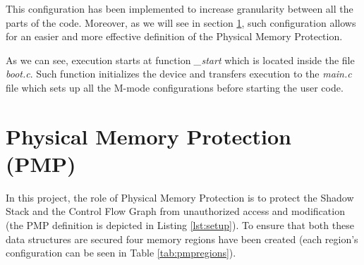 This configuration has been implemented to increase granularity between all the parts
of the code. Moreover, as we will see in section \ref{sec:project_pmp}, such
configuration allows for an easier and more effective definition of the Physical
Memory Protection.

As we can see, execution starts at function \textit{\_start} which is located
inside the file \textit{boot.c}. Such function initializes the device and
transfers execution to the \textit{main.c} file which sets up all the M-mode configurations
before starting the user code.

\section{Physical Memory Protection (PMP)}
\label{sec:project_pmp}

In this project, the role of Physical Memory Protection is to protect the Shadow
Stack and the Control Flow Graph from unauthorized access and modification (the
PMP definition is depicted in Listing \ref{lst:setup}). To ensure that both
these data structures are secured four memory regions have been created (each region's
configuration can be seen in Table \ref{tab:pmpregions}).

